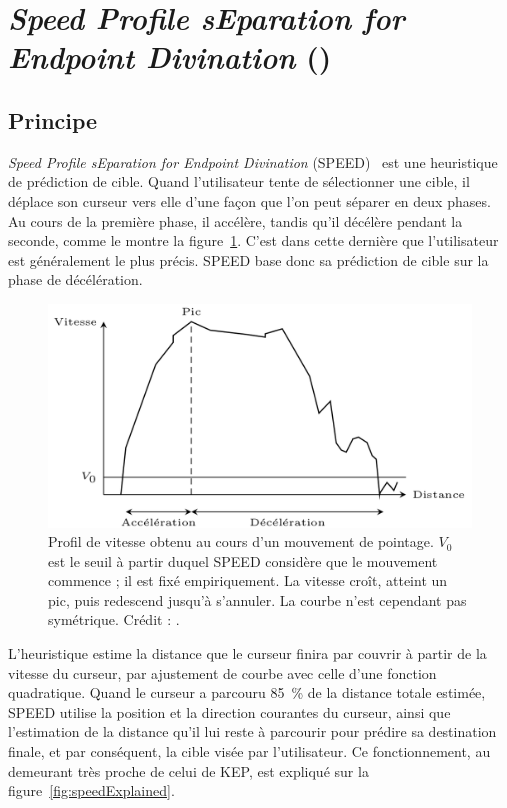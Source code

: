 \section{\emph{Speed Profile sEparation for Endpoint Divination} ()}
	\subsection{Principe}
	\emph{Speed Profile sEparation for Endpoint Divination} (SPEED)~\cite{wonner2011speed} est une heuristique de prédiction de cible. Quand l'utilisateur tente de sélectionner une cible, il déplace son curseur vers elle d'une façon que l'on peut séparer en deux phases. Au cours de la première phase, il accélère, tandis qu'il décélère pendant la seconde, comme le montre la figure~\ref{fig:speedProfile}. C'est dans cette dernière que l'utilisateur est généralement le plus précis. SPEED base donc sa prédiction de cible sur la phase de décélération.
	
	\begin{figure}[H]
		\centering
		\includegraphics[width=\textwidth]{figures/ch2/speedProfile}
		\caption[Profil de vitesse obtenu au cours d'un mouvement de pointage]{Profil de vitesse obtenu au cours d'un mouvement de pointage. $V_{0}$ est le seuil à partir duquel SPEED considère que le mouvement commence ; il est fixé empiriquement. La vitesse croît, atteint un pic, puis redescend jusqu'à s'annuler. La courbe n'est cependant pas symétrique. Crédit : \cite{wonner2011speed}.}
		\label{fig:speedProfile}
	\end{figure}
	
	L'heuristique estime la distance que le curseur finira par couvrir à partir de la vitesse du curseur, par ajustement de courbe avec celle d'une fonction quadratique. Quand le curseur a parcouru 85~\%{} de la distance totale estimée, SPEED utilise la position et la direction courantes du curseur, ainsi que l'estimation de la distance qu'il lui reste à parcourir pour prédire sa destination finale, et par conséquent, la cible visée par l'utilisateur. Ce fonctionnement, au demeurant très proche de celui de KEP, est expliqué sur la figure~\ref{fig:speedExplained}.
	
